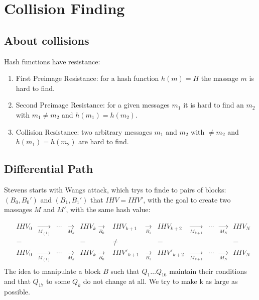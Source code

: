\chapter{ Collision Finding}
\label{chapter:kap3}
\section {About collisions }
Hash functions have resistance:
\begin{enumerate}
    \item First Preimage Resistance: for a hash function $h(m) = H$ the massage $m$ is hard to find.       
    \item Second Preimage Resistance: for a given messages $m_1$ it is hard to find an $m_2$ with $m_1 \neq m_2 $ and $h(m_1) = h(m_2)$.
    \item Collision Resistance: two arbitrary messages  $m_1$ and $m_2$ with $\neq m_2 $ and  $h(m_1) = h(m_2)$ are hard to find.
\end{enumerate}


\section{Differential Path}
Stevens starts with Wangs attack, which trys to finde to pairs of blocks:
\( \left(B_0 , B_0' \right) \)  and \( \left(B_1 , B_1' \right) \) that \( IHV = IHV' \),
 with the goal to create two massages $ M $ and $ M' $, with the same hash value:

\begin{align*}
    &IHV_0 &\xrightarrow[M_{(1)}] {}&\cdots &\xrightarrow[M_k]{} &IHV_k \xrightarrow[B_0]{} &IHV_{k + 1}  &\xrightarrow[B_1]{} &IHV_{k + 2}  &\xrightarrow[M_{k+1}]{}&\cdots &\xrightarrow[M_N]{} &IHV_N\\
    &=     &                        &       &                    &=                         &\ne          &                    &=            &                       &       &                    &= \\
    &IHV_0 &\xrightarrow[M_{(1)}] {}&\cdots &\xrightarrow[M_k]{} &IHV_k \xrightarrow[B_0]{} &IHV'_{k + 1} &\xrightarrow[B_1]{} &IHV'_{k + 2} &\xrightarrow[M_{k+1}]{}&\cdots &\xrightarrow[M_N]{} &IHV_N\\
\end{align*} 
The idea to manipulate a block $B$ such that $Q_1 \dots Q_{16}$ maintain their conditions and that $Q_17$ to some $Q_k$ do not change at all. We try to make k as large as possible.
